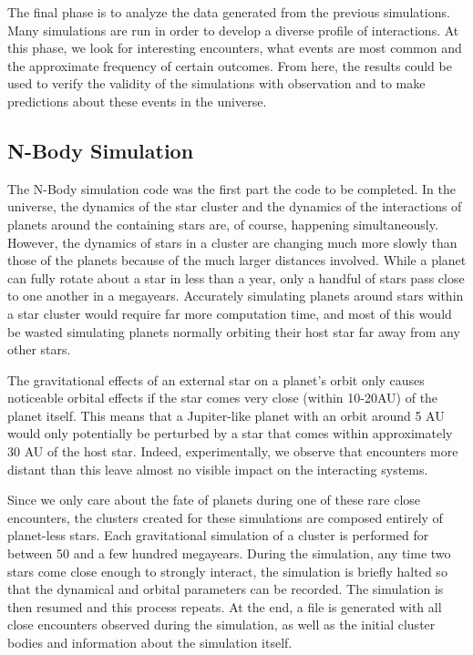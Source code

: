 \documentclass[12pt]{article}
\begin{document}
    The final phase is to analyze the data generated from the previous simulations.
    Many simulations are run in order to develop a diverse profile of interactions.
    At this phase, we look for interesting encounters, what events are most common
    and the approximate frequency of certain outcomes. From here, the results could
    be used to verify the validity of the simulations with observation and to make
    predictions about these events in the universe.


    \subsection{N-Body Simulation}

    The N-Body simulation code was the first part the code to be completed. In the
    universe, the dynamics of the star cluster and the dynamics of the
    interactions of planets around the containing stars are, of course, happening
    simultaneously. However, the dynamics of stars in a cluster are changing much
    more slowly than those of the planets because of the much larger distances
    involved. While a planet can fully rotate about a star in less than a year,
    only a handful of stars pass close to one another in a megayears. Accurately
    simulating planets around stars within a star cluster would require
    far more computation time, and most of this would be wasted simulating
    planets normally orbiting their host star far away from any other stars.

    The gravitational effects of an external star on a planet's orbit only
    causes noticeable orbital effects if the star comes very close (within 10-20AU)
    of the planet itself. This means that a Jupiter-like planet with an orbit around
    5 AU would only potentially be perturbed by a star that comes within 
    approximately 30 AU of the host star. Indeed, experimentally, we observe that
    encounters more distant than this leave almost no visible impact on the
    interacting systems. 

    Since we only care about the fate of planets during one of these 
    rare close encounters,
    the clusters created for these simulations are composed entirely of planet-less stars.
    Each gravitational simulation of a cluster is performed for between 50 
    and a few hundred megayears. During the simulation, any time two stars
    come close enough to strongly interact, the simulation is briefly halted so that
    the dynamical and orbital parameters can be recorded. The simulation is then
    resumed and this process repeats. At the end, a file is generated with
    all close encounters observed during the simulation, as well as the initial
    cluster bodies and information about the simulation itself.
\end{document}
